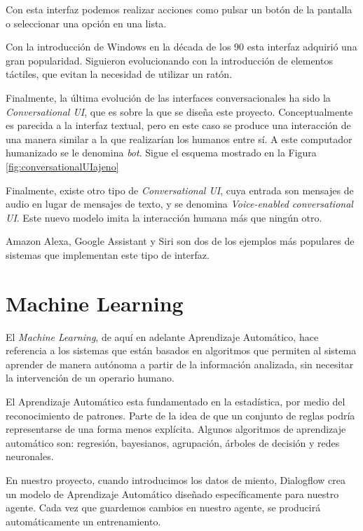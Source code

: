 Con esta interfaz podemos realizar acciones como pulsar un botón de la pantalla o seleccionar una opción en una lista. 

Con la introducción de Windows en la década de los 90 esta interfaz adquirió una gran popularidad. Siguieron evolucionando con la introducción de elementos táctiles, que evitan la necesidad de utilizar un ratón.


Finalmente, la última evolución de las interfaces conversacionales ha sido la \textit{Conversational UI}, que es sobre la que se diseña este proyecto. Conceptualmente es parecida a la interfaz textual, pero en este caso se produce una interacción de una manera similar a la que realizarían los humanos entre sí. A este computador humanizado se le denomina \textit{bot}. Sigue el esquema mostrado en la Figura \ref{fig:conversationalUIajeno}


Finalmente, existe otro tipo de \textit{Conversational UI}, cuya entrada son mensajes de audio en lugar de mensajes de texto, y se denomina \textit{Voice-enabled conversational UI}. Este nuevo modelo imita la interacción humana más que ningún otro.


Amazon Alexa, Google Assistant y Siri son dos de los ejemplos más populares de sistemas que implementan este tipo de interfaz.


\newpage

\section{Machine Learning}

El \textit{Machine Learning}, de aquí en adelante Aprendizaje Automático, hace referencia a los sistemas que están basados en algoritmos que permiten al sistema aprender de manera autónoma a partir de la información analizada, sin necesitar la intervención de un operario humano.

El Aprendizaje Automático esta fundamentado en la estadística, por medio del reconocimiento de patrones. Parte de la idea de que un conjunto de reglas podría representarse de una forma menos explícita. Algunos algoritmos de aprendizaje automático son: regresión, bayesianos, agrupación, árboles de decisión y redes neuronales.

En nuestro proyecto, cuando introducimos los datos de miento, Dialogflow crea un modelo de Aprendizaje Automático diseñado específicamente para nuestro agente.
Cada vez que guardemos cambios en nuestro agente, se producirá automáticamente un entrenamiento.

